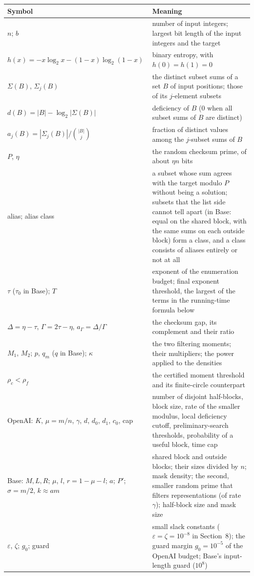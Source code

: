 \documentclass[11pt]{article}
\newcommand{\eps}{\varepsilon}
\theoremstyle{plain}
\begin{document}
\begin{center}
\small
\begin{tabularx}{\linewidth}{>{\raggedright\arraybackslash}p{4.4cm} L}
\toprule
Symbol & Meaning \\
\midrule
$n$; $b$ & number of input integers; largest bit length of the input integers and the target \\
$h(x) = -x\log_2 x - (1-x)\log_2(1-x)$ & binary entropy, with $h(0) = h(1) = 0$ \\
$\Sigma(B)$, $\Sigma_j(B)$ & the distinct subset sums of a set $B$ of input positions; those of its $j$-element subsets \\
$d(B) = |B| - \log_2|\Sigma(B)|$ & deficiency of $B$ (0 when all subset sums of $B$ are distinct) \\
$a_j(B) = |\Sigma_j(B)|/\binom{|B|}{j}$ & fraction of distinct values among the $j$-subset sums of $B$ \\
$P$, $\eta$ & the random checksum prime, of about $\eta n$ bits \\
alias; alias class & a subset whose sum agrees with the target modulo $P$ without being a solution; subsets that the list side cannot tell apart (in Base: equal on the shared block, with the same sums on each outside block) form a class, and a class consists of aliases entirely or not at all \\
$\tau$ ($\tau_0$ in Base); $T$ & exponent of the enumeration budget; final exponent threshold, the largest of the terms in the running-time formula below \\
$\Delta = \eta - \tau$, $\Gamma = 2\tau - \eta$, $a_\Gamma = \Delta/\Gamma$ & the checksum gap, its complement and their ratio \\
$M_1$, $M_2$; $p$, $q_m$ ($q$ in Base); $\kappa$ & the two filtering moments; their multipliers; the power applied to the densities \\
$\rho_c < \rho_f$ & the certified moment threshold and its finite-circle counterpart \\
OpenAI: $K$, $\mu = m/n$, $\gamma$, $d$, $d_0$, $d_1$, $c_0$, cap & number of disjoint half-blocks, block size, rate of the smaller modulus, local deficiency cutoff, preliminary-search thresholds, probability of a useful block, time cap \\
Base: $M, L, R$; $\mu$, $l$, $r = 1 - \mu - l$; $a$; $P'$; $\sigma = m/2$, $k \approx am$ & shared block and outside blocks; their sizes divided by $n$; mask density; the second, smaller random prime that filters representations (of rate $\gamma$); half-block size and mask size \\
$\eps$, $\zeta$; $g_0$; guard & small slack constants ($\eps = \zeta = 10^{-8}$ in Section~8); the guard margin $g_0 = 10^{-5}$ of the OpenAI budget; Base's input-length guard ($10^8$) \\
\bottomrule
\end{tabularx}
\end{center}
\end{document}
